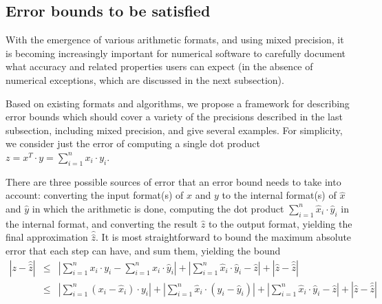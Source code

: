 \documentclass[manuscript,review]{acmart}
\newcommand{\ignore}[1]{}
\begin{document}
\subsection{Error bounds to be satisfied}\label{Error_Bounds}

With the emergence of various arithmetic formats, and using mixed precision,
it is becoming increasingly important for numerical software to carefully
document what accuracy and related properties users can expect 
(in the absence of numerical exceptions, which are discussed 
in the next subsection).

Based on existing formats and
algorithms, we propose a framework for describing error bounds which
should cover a variety of the precisions described in the last
subsection, including mixed precision, and give several examples.
For simplicity, we consider just the error of computing a
single dot product $z = x^T \cdot y = \sum_{i=1}^n x_i \cdot y_i$.

There are three possible sources of error that an error bound 
needs to take into account: converting the input format(s) of 
$x$ and $y$ to the internal format(s) of $\hat{x}$ and $\hat{y}$ 
in which the arithmetic is done, computing 
the dot product $\sum_{i=1}^n \hat{x}_i \cdot \hat{y}_i$ 
in the internal format, and converting the result $\hat{z}$
to the output format, yielding the final approximation 
$\hat{\hat{z}}$. It is most straightforward to bound
the maximum absolute error that each step can have, and sum them,
yielding the bound
\begin{eqnarray*}
|z - \hat{\hat{z}} | & \leq &  
| \sum_{i=1}^n x_i \cdot y_i - \sum_{i=1}^n \hat{x}_i \cdot \hat{y}_i | 
+ |\sum_{i=1}^n \hat{x}_i \cdot \hat{y}_i - \hat{z} |
+ | \hat{z} - \hat{\hat{z}} | \\
& \leq &
| \sum_{i=1}^n (x_i - \hat{x}_i) \cdot y_i | 
+ | \sum_{i=1}^n \hat{x}_i \cdot (y_i - \hat{y}_i)  | 
+ |\sum_{i=1}^n \hat{x}_i \cdot \hat{y}_i - \hat{z} |
+ | \hat{z} - \hat{\hat{z}} | 
\end{eqnarray*}
\end{document}
